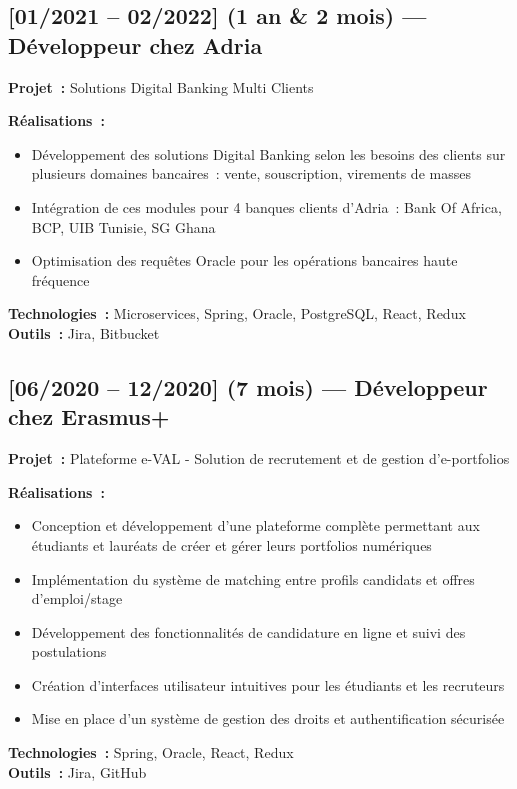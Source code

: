 \subsection*{[01/2021 -- 02/2022] (1 an \& 2 mois) --- Développeur chez Adria}
\textbf{Projet~:} Solutions Digital Banking Multi Clients

\textbf{Réalisations~:}
\begin{itemize}
    \item Développement des solutions Digital Banking selon les besoins des clients sur plusieurs domaines bancaires~: vente, souscription, virements de masses
    \item Intégration de ces modules pour 4 banques clients d'Adria~: Bank Of Africa, BCP, UIB Tunisie, SG Ghana
    \item Optimisation des requêtes Oracle pour les opérations bancaires haute fréquence
\end{itemize}
\textbf{Technologies~:} Microservices, Spring, Oracle, PostgreSQL, React, Redux\\
\textbf{Outils~:} Jira, Bitbucket

\subsection*{[06/2020 -- 12/2020] (7 mois) --- Développeur chez Erasmus+}
\textbf{Projet~:} Plateforme e-VAL - Solution de recrutement et de gestion d'e-portfolios

\textbf{Réalisations~:}
\begin{itemize}
    \item Conception et développement d'une plateforme complète permettant aux étudiants et lauréats de créer et gérer leurs portfolios numériques
    \item Implémentation du système de matching entre profils candidats et offres d'emploi/stage
    \item Développement des fonctionnalités de candidature en ligne et suivi des postulations
    \item Création d'interfaces utilisateur intuitives pour les étudiants et les recruteurs
    \item Mise en place d'un système de gestion des droits et authentification sécurisée
\end{itemize}
\textbf{Technologies~:} Spring, Oracle, React, Redux\\
\textbf{Outils~:} Jira, GitHub

